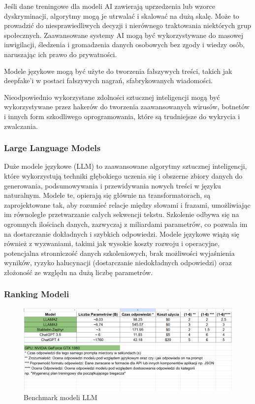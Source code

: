 Jeśli dane treningowe dla modeli AI zawierają uprzedzenia lub wzorce dyskryminacji, algorytmy mogą je utrwalać i skalować na dużą skalę. Może to prowadzić do niesprawiedliwych decyzji i nierównego traktowania niektórych grup społecznych. Zaawansowane systemy AI mogą być wykorzystywane do masowej inwigilacji, śledzenia i gromadzenia danych osobowych bez zgody i wiedzy osób, naruszając ich prawo do prywatności.

Modele językowe mogą być użyte do tworzenia fałszywych treści, takich jak deepfake'i w postaci fałszywych nagrań, sfabrykowanych wiadomości.

Nieodpowiednio wykorzystane zdolności sztucznej inteligencji mogą być wykorzystywane przez hakerów do tworzenia zaawansowanych wirusów, botnetów i innych form szkodliwego oprogramowania, które są trudniejsze do wykrycia i zwalczania.

\subsubsection{Large Language Models}
Duże modele językowe (LLM) to zaawansowane algorytmy sztucznej inteligencji, które wykorzystują techniki głębokiego uczenia się i obszerne zbiory danych do generowania, podsumowywania i przewidywania nowych treści w języku naturalnym. Modele te, opierają się głównie na transformatorach, są zaprojektowane tak, aby rozumieć relacje między słowami i frazami, umożliwiając im równoległe przetwarzanie całych sekwencji tekstu. Szkolenie odbywa się na ogromnych ilościach danych, zazwyczaj z miliardami parametrów, co pozwala im na dostarczanie dokładnych i szybkich odpowiedzi. Modele językowe wiążą się również z wyzwaniami, takimi jak wysokie koszty rozwoju i operacyjne, potencjalna stronniczość danych szkoleniowych, brak możliwości wyjaśnienia wyników, ryzyko halucynacji (dostarczanie niedokładnych odpowiedzi) oraz złożoność ze względu na dużą liczbę parametrów.

\subsubsection{Ranking Modeli}

\begin{figure}[h]
    \centering
    \includegraphics[width=1\textwidth]{Obrazy/llms_benchmark.png}
    \caption{Benchmark modeli LLM}
    \label{fig:my_label}
\end{figure}


